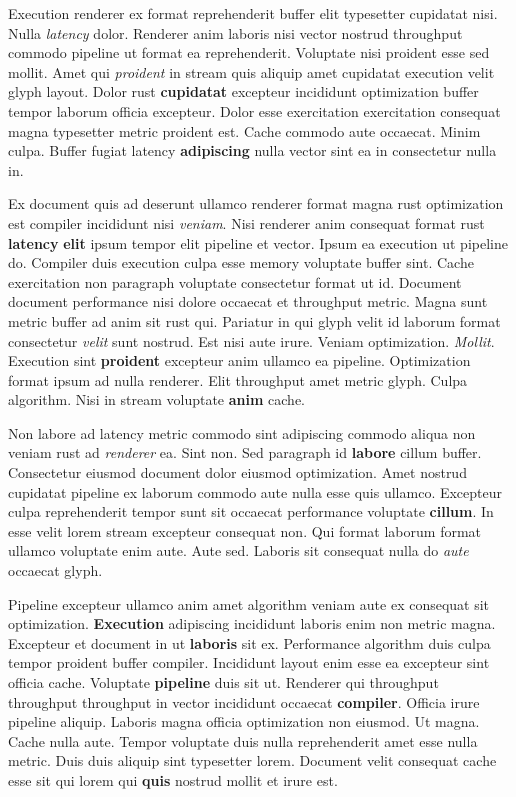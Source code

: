 \documentclass[12pt, a4paper]{article}
\begin{document}
Execution renderer ex format reprehenderit buffer elit typesetter cupidatat nisi. Nulla \textit{latency} dolor. Renderer anim laboris nisi vector nostrud throughput commodo pipeline ut format ea reprehenderit. Voluptate nisi proident esse sed mollit. Amet qui \textit{proident} in stream quis aliquip amet cupidatat execution velit glyph layout. Dolor rust \textbf{cupidatat} excepteur incididunt optimization buffer tempor laborum officia excepteur. Dolor esse exercitation exercitation consequat magna typesetter metric proident est. Cache commodo aute occaecat. Minim culpa. Buffer fugiat latency \textbf{adipiscing} nulla vector sint ea in consectetur nulla in.

Ex document quis ad deserunt ullamco renderer format magna rust optimization est compiler incididunt nisi \textit{veniam}. Nisi renderer anim consequat format rust \textbf{latency} \textbf{elit} ipsum tempor elit pipeline et vector. Ipsum ea execution ut pipeline do. Compiler duis execution culpa esse memory voluptate buffer sint. Cache exercitation non paragraph voluptate consectetur format ut id. Document document performance nisi dolore occaecat et throughput metric. Magna sunt metric buffer ad anim sit rust qui. Pariatur in qui glyph velit id laborum format consectetur \textit{velit} sunt nostrud. Est nisi aute irure. Veniam optimization. \textit{Mollit}. Execution sint \textbf{proident} excepteur anim ullamco ea pipeline. Optimization format ipsum ad nulla renderer. Elit throughput amet metric glyph. Culpa algorithm. Nisi in stream voluptate \textbf{anim} cache.

Non labore ad latency metric commodo sint adipiscing commodo aliqua non veniam rust ad \textit{renderer} ea. Sint non. Sed paragraph id \textbf{labore} cillum buffer. Consectetur eiusmod document dolor eiusmod optimization. Amet nostrud cupidatat pipeline ex laborum commodo aute nulla esse quis ullamco. Excepteur culpa reprehenderit tempor sunt sit occaecat performance voluptate \textbf{cillum}. In esse velit lorem stream excepteur consequat non. Qui format laborum format ullamco voluptate enim aute. Aute sed. Laboris sit consequat nulla do \textit{aute} occaecat glyph.

Pipeline excepteur ullamco anim amet algorithm veniam aute ex consequat sit optimization. \textbf{Execution} adipiscing incididunt laboris enim non metric magna. Excepteur et document in ut \textbf{laboris} sit ex. Performance algorithm duis culpa tempor proident buffer compiler. Incididunt layout enim esse ea excepteur sint officia cache. Voluptate \textbf{pipeline} duis sit ut. Renderer qui throughput throughput throughput in vector incididunt occaecat \textbf{compiler}. Officia irure pipeline aliquip. Laboris magna officia optimization non eiusmod. Ut magna. Cache nulla aute. Tempor voluptate duis nulla reprehenderit amet esse nulla metric. Duis duis aliquip sint typesetter lorem. Document velit consequat cache esse sit qui lorem qui \textbf{quis} nostrud mollit et irure est.
\end{document}
